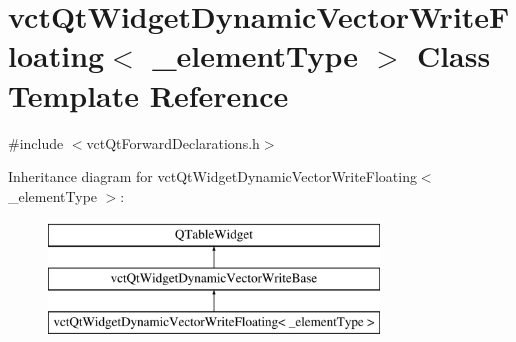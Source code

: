 \hypertarget{classvct_qt_widget_dynamic_vector_write_floating}{\section{vct\-Qt\-Widget\-Dynamic\-Vector\-Write\-Floating$<$ \-\_\-element\-Type $>$ Class Template Reference}
\label{classvct_qt_widget_dynamic_vector_write_floating}
}


{\ttfamily \#include $<$vct\-Qt\-Forward\-Declarations.\-h$>$}

Inheritance diagram for vct\-Qt\-Widget\-Dynamic\-Vector\-Write\-Floating$<$ \-\_\-element\-Type $>$\-:\begin{figure}[H]
\begin{center}
\leavevmode
\includegraphics[height=3.000000cm]{d1/da5/classvct_qt_widget_dynamic_vector_write_floating}
\end{center}
\end{figure}
